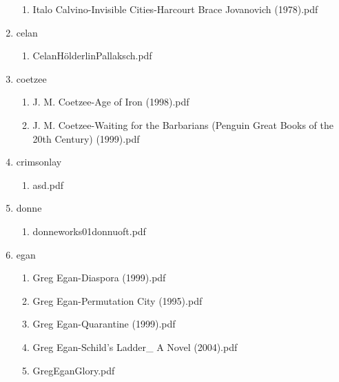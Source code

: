\documentclass[11pt]{article}
\begin{document}
\begin{enumerate}
\begin{enumerate}
\item Italo Calvino-Invisible Cities-Harcourt Brace Jovanovich (1978).pdf
\label{sec-1-1-1-1-28-13-8}
\end{enumerate}

\item celan
\label{sec-1-1-1-1-28-14}
\begin{enumerate}
\item CelanHölderlinPallaksch.pdf
\label{sec-1-1-1-1-28-14-1}
\end{enumerate}

\item coetzee
\label{sec-1-1-1-1-28-15}
\begin{enumerate}
\item J. M. Coetzee-Age of Iron (1998).pdf
\label{sec-1-1-1-1-28-15-1}

\item J. M. Coetzee-Waiting for the Barbarians (Penguin Great Books of the 20th Century) (1999).pdf
\label{sec-1-1-1-1-28-15-2}
\end{enumerate}

\item crimsonlay
\label{sec-1-1-1-1-28-16}
\begin{enumerate}
\item asd.pdf
\label{sec-1-1-1-1-28-16-1}
\end{enumerate}

\item donne
\label{sec-1-1-1-1-28-17}
\begin{enumerate}
\item donneworks01donnuoft.pdf
\label{sec-1-1-1-1-28-17-1}
\end{enumerate}

\item egan
\label{sec-1-1-1-1-28-18}
\begin{enumerate}
\item Greg Egan-Diaspora (1999).pdf
\label{sec-1-1-1-1-28-18-1}

\item Greg Egan-Permutation City (1995).pdf
\label{sec-1-1-1-1-28-18-2}

\item Greg Egan-Quarantine (1999).pdf
\label{sec-1-1-1-1-28-18-3}

\item Greg Egan-Schild's Ladder\_ A Novel (2004).pdf
\label{sec-1-1-1-1-28-18-4}

\item GregEganGlory.pdf
\label{sec-1-1-1-1-28-18-5}
\end{enumerate}


\end{enumerate}
\end{document}
